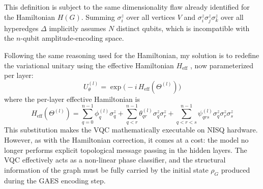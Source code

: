 This definition is subject to the same dimensionality flaw already identified for the Hamiltonian $H(G)$. Summing $\sigma_i^z$ over all vertices $V$ and $\sigma_i^z\sigma_j^z\sigma_k^z$ over all hyperedges $\Delta$ implicitly assumes $N$ distinct qubits, which is incompatible with the $n$-qubit amplitude-encoding space.

Following the same reasoning used for the Hamiltonian, my solution is to redefine the variational unitary using the effective Hamiltonian $H_\text{eff}$ \cite{artmodificheencoding}, now parameterized per layer:
\begin{equation}
    U_{\theta}^{(l)} = \exp\bigl(-i\, H_\text{eff}(\Theta^{(l)})\bigr)
\end{equation}
where the per-layer effective Hamiltonian is
\begin{equation}
    H_\text{eff}(\Theta^{(l)}) = \sum_{q=0}^{n-1} \phi_q^{(l)} \sigma_q^z + \sum_{q<r}^{n-1} \theta_{qr}^{(l)} \sigma_q^z \sigma_r^z + \sum_{q<r<s}^{n-1} \psi_{qrs}^{(l)} \sigma_q^z \sigma_r^z \sigma_s^z
\end{equation}
This substitution makes the VQC mathematically executable on NISQ hardware. However, as with the Hamiltonian correction, it comes at a cost: the model no longer performs explicit topological message passing in the hidden layers. The VQC effectively acts as a non-linear phase classifier, and the structural information of the graph must be fully carried by the initial state $\rho_G$ produced during the GAES encoding step.

